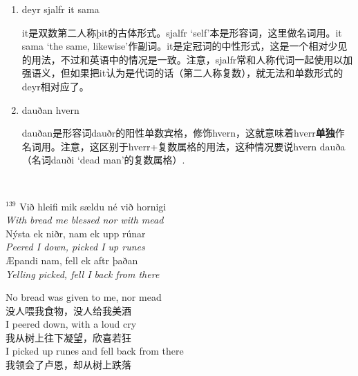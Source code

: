 \begin{grammar*}{}
    \begin{enumerate}[leftmargin=*]

        \item deyr sjalfr it sama

              it是双数第二人称þit的古体形式。sjalfr `self'本是形容词，这里做名词用。it sama
              `the same, likewise'作副词。it是定冠词的中性形式，这是一个相对少见的用法，不过和英语中的情况是一致。注意，sjalfr常和人称代词一起使用以加强语义，但如果把it认为是代词的话（第二人称复数），就无法和单数形式的deyr相对应了。

        \item dauðan hvern

              dauðan是形容词dauðr的阳性单数宾格，修饰hvern，这就意味着hverr\textbf{单独}作名词用。注意，这区别于hverr+复数属格的用法，这种情况要说hvern dauða（名词dauði `dead man'的复数属格）.

    \end{enumerate}
\end{grammar*}
\hspace*{\fill}\\ %
\begin{paracol}{2}
    \noindent
    $^{139}$ Við hleifi mik sældu né við hornigi\\
    \textit{With bread me blessed nor with mead}\\
    Nýsta ek niðr, nam ek upp rúnar\\
    \textit{Peered I down, picked I up runes}\\
    \MakeUppercase æpandi nam, fell ek aftr þaðan\\
    \textit{Yelling picked, fell I back from there}\\
    \switchcolumn

    \noindent
    No bread was given to me, nor mead\\
    没人喂我食物，没人给我美酒\\
    I peered down, with a loud cry\\
    我从树上往下凝望，欣喜若狂\\
    I picked up runes and fell back from there\\
    我领会了卢恩，却从树上跌落\\

\end{paracol}

